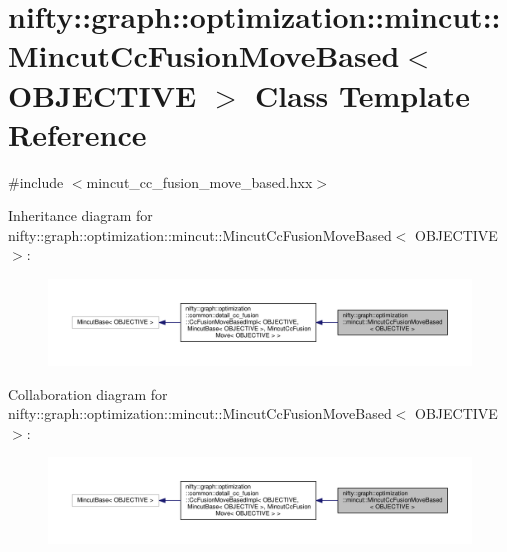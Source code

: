 \hypertarget{classnifty_1_1graph_1_1optimization_1_1mincut_1_1MincutCcFusionMoveBased}{}\section{nifty\+:\+:graph\+:\+:optimization\+:\+:mincut\+:\+:Mincut\+Cc\+Fusion\+Move\+Based$<$ O\+B\+J\+E\+C\+T\+I\+V\+E $>$ Class Template Reference}
\label{classnifty_1_1graph_1_1optimization_1_1mincut_1_1MincutCcFusionMoveBased}


{\ttfamily \#include $<$mincut\+\_\+cc\+\_\+fusion\+\_\+move\+\_\+based.\+hxx$>$}



Inheritance diagram for nifty\+:\+:graph\+:\+:optimization\+:\+:mincut\+:\+:Mincut\+Cc\+Fusion\+Move\+Based$<$ O\+B\+J\+E\+C\+T\+I\+V\+E $>$\+:\nopagebreak
\begin{figure}[H]
\begin{center}
\leavevmode
\includegraphics[width=350pt]{classnifty_1_1graph_1_1optimization_1_1mincut_1_1MincutCcFusionMoveBased__inherit__graph}
\end{center}
\end{figure}


Collaboration diagram for nifty\+:\+:graph\+:\+:optimization\+:\+:mincut\+:\+:Mincut\+Cc\+Fusion\+Move\+Based$<$ O\+B\+J\+E\+C\+T\+I\+V\+E $>$\+:\nopagebreak
\begin{figure}[H]
\begin{center}
\leavevmode
\includegraphics[width=350pt]{classnifty_1_1graph_1_1optimization_1_1mincut_1_1MincutCcFusionMoveBased__coll__graph}
\end{center}
\end{figure}
